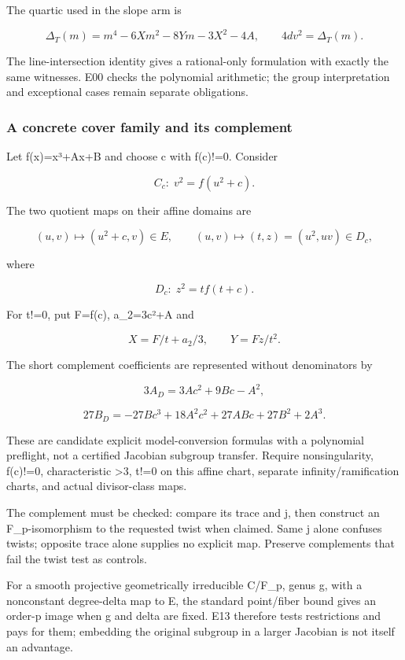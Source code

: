 \documentclass[
  10pt,
]{article}
\begin{document}
The quartic used in the slope arm is

\[
\Delta_T(m)=m^4-6Xm^2-8Ym-3X^2-4A,\qquad 4dv^2=\Delta_T(m).
\]

The line-intersection identity gives a rational-only formulation with
exactly the same witnesses. E00 checks the polynomial arithmetic; the
group interpretation and exceptional cases remain separate obligations.

\subsubsection{A concrete cover family and its
complement}\label{a-concrete-cover-family-and-its-complement}

Let f(x)=x³+Ax+B and choose c with f(c)!=0. Consider

\[
C_c:\;v^2=f(u^2+c).
\]

The two quotient maps on their affine domains are

\[
(u,v)\longmapsto(u^2+c,v)\in E,\qquad
(u,v)\longmapsto(t,z)=(u^2,uv)\in D_c,
\]

where

\[
D_c:\;z^2=t f(t+c).
\]

For t!=0, put F=f(c), a\_2=3c²+A and

\[
X=F/t+a_2/3,\qquad Y=Fz/t^2.
\]

The short complement coefficients are represented without denominators
by

\[
3A_D=3Ac^2+9Bc-A^2,
\]

\[
27B_D=-27Bc^3+18A^2c^2+27ABc+27B^2+2A^3.
\]

These are candidate explicit model-conversion formulas with a polynomial
preflight, not a certified Jacobian subgroup transfer. Require
nonsingularity, f(c)!=0, characteristic \textgreater3, t!=0 on this
affine chart, separate infinity/ramification charts, and actual
divisor-class maps.

The complement must be checked: compare its trace and j, then construct
an F\_p-isomorphism to the requested twist when claimed. Same j alone
confuses twists; opposite trace alone supplies no explicit map. Preserve
complements that fail the twist test as controls.

For a smooth projective geometrically irreducible C/F\_p, genus g, with
a nonconstant degree-delta map to E, the standard point/fiber bound
gives an order-p image when g and delta are fixed. E13 therefore tests
restrictions and pays for them; embedding the original subgroup in a
larger Jacobian is not itself an advantage.
\end{document}
